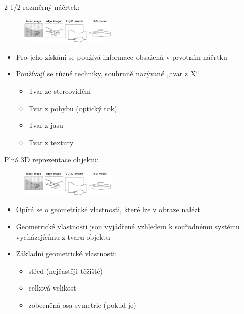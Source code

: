 \begin{frame}
2 1/2 rozměrný náčrtek:
	\begin{figure}[!ht]
	\centering
	\includegraphics[trim=600 0 300 80,clip, width = 0.4\textwidth]{./tank}
	\end{figure}
\begin{itemize}
	\item Pro jeho získání se používá informace obsažená v prvotním náčrtku
	\item Používají se různé techniky, souhrnně nazývané „tvar  z X“ 
	\begin{itemize}
	    \item Tvar ze stereovidění
	    \item Tvar z pohybu (optický tok)
	    \item Tvar z jasu
	    \item Tvar z textury
	\end{itemize}
\end{itemize}
\end{frame}

\begin{frame}
Plná 3D reprezentace objektu:
	\begin{figure}[!ht]
	\centering
	\includegraphics[trim=950 0 0 80,clip, width = 0.4\textwidth]{./tank}
	\end{figure}
\begin{itemize}
	\item Opírá se o  geometrické  vlastnosti,  které  lze  v obraze  nalézt
	\item Geometrické  vlastnosti jsou vyjádřené  vzhledem k souřadnému systému vycházejícímu z tvaru objektu
	\item Základní geometrické vlastnosti:
	\begin{itemize}
	    \item střed (nejčastěji těžiště)
	    \item celková velikost 
	    \item zobecněná osa symetrie (pokud je)
	\end{itemize}
\end{itemize}
\end{frame}

